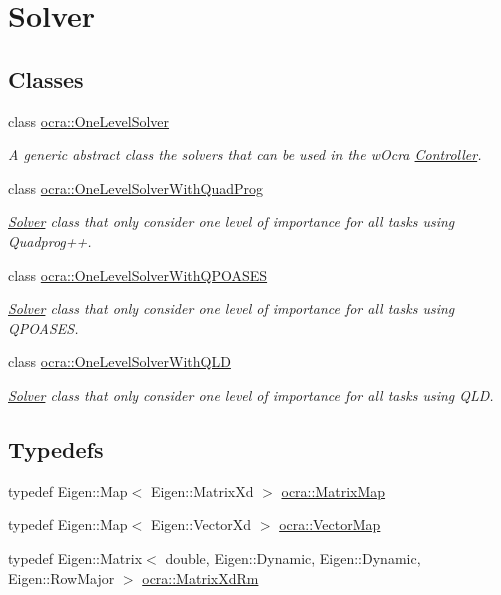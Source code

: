 \hypertarget{group__solver}{}\section{Solver}
\label{group__solver}
\subsection*{Classes}
\begin{DoxyCompactItemize}
\item 
class \hyperlink{classocra_1_1OneLevelSolver}{ocra\+::\+One\+Level\+Solver}
\begin{DoxyCompactList}\small\item\em A generic abstract class the solvers that can be used in the w\+Ocra \hyperlink{classocra_1_1Controller}{Controller}. \end{DoxyCompactList}\item 
class \hyperlink{classocra_1_1OneLevelSolverWithQuadProg}{ocra\+::\+One\+Level\+Solver\+With\+Quad\+Prog}
\begin{DoxyCompactList}\small\item\em \hyperlink{classocra_1_1Solver}{Solver} class that only consider one level of importance for all tasks using Quadprog++. \end{DoxyCompactList}\item 
class \hyperlink{classocra_1_1OneLevelSolverWithQPOASES}{ocra\+::\+One\+Level\+Solver\+With\+Q\+P\+O\+A\+S\+ES}
\begin{DoxyCompactList}\small\item\em \hyperlink{classocra_1_1Solver}{Solver} class that only consider one level of importance for all tasks using Q\+P\+O\+A\+S\+ES. \end{DoxyCompactList}\item 
class \hyperlink{classocra_1_1OneLevelSolverWithQLD}{ocra\+::\+One\+Level\+Solver\+With\+Q\+LD}
\begin{DoxyCompactList}\small\item\em \hyperlink{classocra_1_1Solver}{Solver} class that only consider one level of importance for all tasks using Q\+LD. \end{DoxyCompactList}\end{DoxyCompactItemize}
\subsection*{Typedefs}
\begin{DoxyCompactItemize}
\item 
typedef Eigen\+::\+Map$<$ Eigen\+::\+Matrix\+Xd $>$ \hyperlink{group__solver_ga2890a4739c18700eeea0645d1e41b5f7}{ocra\+::\+Matrix\+Map}
\item 
typedef Eigen\+::\+Map$<$ Eigen\+::\+Vector\+Xd $>$ \hyperlink{group__solver_ga48f83fdb8879c800a49682c6f9c3f2e5}{ocra\+::\+Vector\+Map}
\item 
typedef Eigen\+::\+Matrix$<$ double, Eigen\+::\+Dynamic, Eigen\+::\+Dynamic, Eigen\+::\+Row\+Major $>$ \hyperlink{group__solver_ga70eb87299c2fc1db3c4aac05df67d889}{ocra\+::\+Matrix\+Xd\+Rm}
\end{DoxyCompactItemize}


